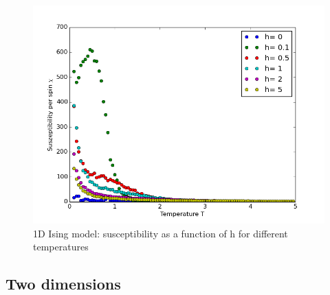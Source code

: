 \documentclass[12pt,a4paper,titlepage]{article}
\begin{document}
\begin{figure}
\centering
\includegraphics[width=12cm]{Plots/differnt_h_s_10000}
\caption{1D Ising model: susceptibility as a function of h for different temperatures}
\end{figure}




\newpage
\subsection{Two dimensions}
\end{document}
